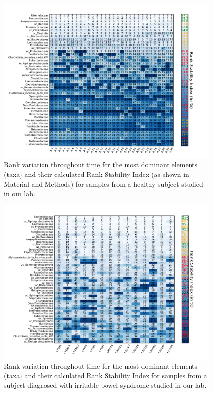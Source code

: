 \begin{figure}
	\centering
	\includegraphics[width=0.99\textwidth]{results/corrank/IBS_h_A_amplicons_family_Rank.pdf}
	\RSItable	
	\caption{Rank variation throughout time for the most dominant elements (taxa) and their calculated Rank Stability Index (as shown in Material and Methods) for samples from a healthy subject studied in our lab\cite{IBS}.}
	\label{fig:corrank_IBS_A}
\end{figure}

\begin{figure}
	\centering
	\hspace*{-4.5mm}\includegraphics[width=0.99\textwidth]{results/corrank/IBS_P2_Metatranscriptores_Rank.pdf}
	\RSItable
	\caption{Rank variation throughout time for the most dominant elements (taxa) and their calculated Rank Stability Index for samples from a subject diagnosed with irritable bowel syndrome studied in our lab\cite{IBS}.}
	\label{fig:corrank_IBS_P2}
\end{figure}

